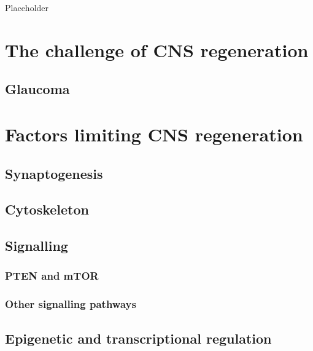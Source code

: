 \documentclass[
  12pt,
  a4paper,
]{book}
\begin{document}
Placeholder

\hypertarget{the-challenge-of-cns-regeneration}{%
\section{The challenge of CNS regeneration}\label{the-challenge-of-cns-regeneration}}

\hypertarget{glaucoma}{%
\subsection{Glaucoma}\label{glaucoma}}

\hypertarget{factors-limiting-cns-regeneration}{%
\section{Factors limiting CNS regeneration}\label{factors-limiting-cns-regeneration}}

\hypertarget{synaptogenesis}{%
\subsection{Synaptogenesis}\label{synaptogenesis}}

\hypertarget{cytoskeleton}{%
\subsection{Cytoskeleton}\label{cytoskeleton}}

\hypertarget{signalling}{%
\subsection{Signalling}\label{signalling}}

\hypertarget{pten-and-mtor}{%
\subsubsection{PTEN and mTOR}\label{pten-and-mtor}}

\hypertarget{other-signalling-pathways}{%
\subsubsection{Other signalling pathways}\label{other-signalling-pathways}}

\hypertarget{epigenetic-and-transcriptional-regulation}{%
\subsection{Epigenetic and transcriptional regulation}\label{epigenetic-and-transcriptional-regulation}}
\end{document}
